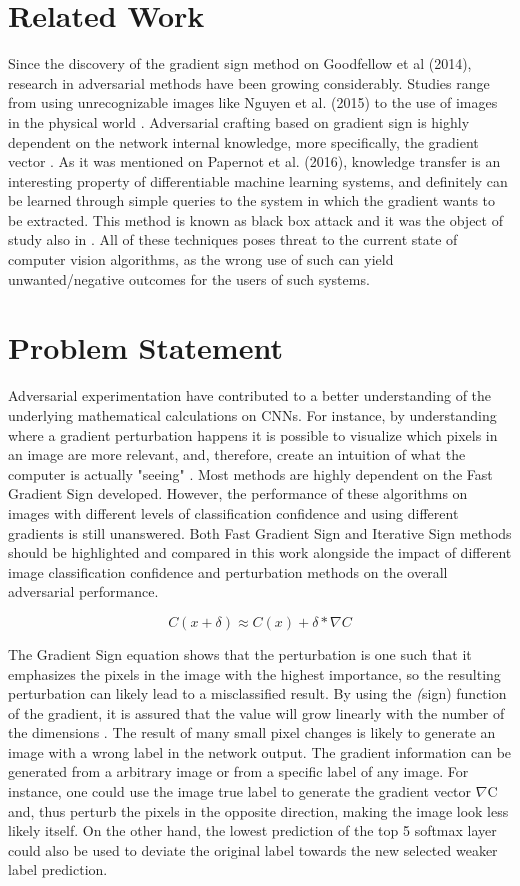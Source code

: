 \documentclass[10pt,journal,compsoc]{IEEEtran}
\begin{document}
\section{Related Work}
\label{sec:related_work}
Since the discovery of the gradient sign method on Goodfellow et al (2014), research in adversarial methods have been growing considerably. Studies range from using unrecognizable images like Nguyen et al. (2015) \cite{nguyen2015} to the use of images in the physical world \cite{goodfellow2016}. Adversarial crafting based on gradient sign is highly dependent on the network internal knowledge, more specifically, the gradient vector \cite{papernot2016transf}. As it was mentioned on Papernot et al. (2016), knowledge transfer is an interesting property of differentiable machine learning systems, and definitely can be learned through simple queries to the system in which the gradient wants to be extracted. This method is known as black box attack and it was the object of study also in \cite{papernot2016}. All of these techniques poses threat to the current state of computer vision algorithms, as the wrong use of such can yield unwanted/negative outcomes for the users of such systems.
\section{Problem Statement}
\label{sec:research_question}

Adversarial experimentation have contributed to a better understanding of the underlying mathematical calculations on CNNs. For instance, by understanding where a gradient perturbation happens it is possible to visualize which pixels in an image are more relevant, and, therefore, create an intuition of what the computer is actually "seeing" \cite{lowd2005}. Most methods are highly dependent on the Fast Gradient Sign developed. However, the performance of these algorithms on images with different levels of classification confidence and using different gradients is still unanswered. Both Fast Gradient Sign and Iterative Sign methods should be highlighted and compared in this work alongside the impact of different image classification confidence and perturbation methods on the overall adversarial performance.

$$ C(x + \delta)\approx C(x) + \delta * \nabla C$$

The Gradient Sign equation shows that the perturbation is one such that it emphasizes the pixels in the image with the highest importance, so the resulting perturbation can likely lead to a misclassified result. By using the \textit(sign) function of the gradient, it is assured that the value will grow linearly with the number of the dimensions \cite{goodfellow2014}. The result of many small pixel changes is likely to generate an image with a wrong label in the network output. The gradient information can be generated from a arbitrary image or from a specific label of any image. For instance, one could use the image true label to generate the gradient vector $\nabla$C and, thus perturb the pixels in the opposite direction, making the image look less likely itself. On the other hand, the lowest prediction of the top 5 softmax layer could also be used to deviate the original label towards the new selected weaker label prediction.
\end{document}
